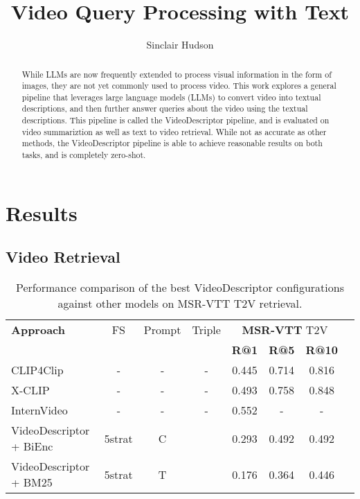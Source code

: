 \documentclass{article}
\title{Video Query Processing with Text}
\author{Sinclair Hudson}
\begin{document}
\maketitle

\begin{abstract}
      While LLMs are now frequently extended to process visual information in the form of images, they are not yet commonly used to process video.
      This work explores a general pipeline that leverages large language models (LLMs) to convert video into textual descriptions, and then further answer queries about the video using the textual descriptions.
      This pipeline is called the VideoDescriptor pipeline, and is evaluated on video summariztion as well as text to video retrieval.
      While not as accurate as other methods, the VideoDescriptor pipeline is able to achieve reasonable results on both tasks, and is completely zero-shot.
\end{abstract}







\section{Results}

\subsection{Video Retrieval}

\begin{table}[htbp]
  \centering
  \begin{tabular}{lccccccc}
    \toprule
    \textbf{Approach} &FS & Prompt & Triple & \multicolumn{3}{c}{\textbf{MSR-VTT} T2V} \\
    \cmidrule(lr){5-7}
                      &&&& \textbf{R@1} & \textbf{R@5} & \textbf{R@10} \\
    \midrule
    CLIP4Clip \cite{clip4clip} &-&-&-& 0.445 & 0.714 &  0.816\\
    \midrule
    X-CLIP \cite{xclip} &-&-&-& 0.493 & 0.758 & 0.848 \\
    \midrule
    InternVideo \cite{internvideo} &-&-&-& 0.552 & - & - \\
    \bottomrule
    VideoDescriptor + BiEnc &5strat&C& & 0.293 & 0.492 & 0.492 \\
    \midrule
    VideoDescriptor + BM25 &5strat&T& & 0.176 & 0.364 & 0.446 \\
  \end{tabular}
  \label{tab:model_comparison}
  \caption{Performance comparison of the best VideoDescriptor configurations against other models on MSR-VTT T2V retrieval.}
\end{table}
\end{document}
